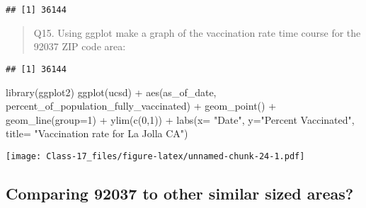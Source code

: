 \documentclass[
]{article}
\newenvironment{Shaded}{\begin{snugshade}}{\end{snugshade}}
\newcommand{\AttributeTok}[1]{\textcolor[rgb]{0.77,0.63,0.00}{#1}}
\newcommand{\DecValTok}[1]{\textcolor[rgb]{0.00,0.00,0.81}{#1}}
\newcommand{\FunctionTok}[1]{\textcolor[rgb]{0.00,0.00,0.00}{#1}}
\newcommand{\NormalTok}[1]{#1}
\newcommand{\OtherTok}[1]{\textcolor[rgb]{0.56,0.35,0.01}{#1}}
\newcommand{\SpecialCharTok}[1]{\textcolor[rgb]{0.00,0.00,0.00}{#1}}
\newcommand{\StringTok}[1]{\textcolor[rgb]{0.31,0.60,0.02}{#1}}
\begin{document}
\begin{verbatim}
## [1] 36144
\end{verbatim}

\begin{quote}
Q15. Using ggplot make a graph of the vaccination rate time course for
the 92037 ZIP code area:
\end{quote}

\begin{Shaded}
\end{Shaded}

\begin{verbatim}
## [1] 36144
\end{verbatim}

\begin{Shaded}
\begin{Highlighting}[]
\FunctionTok{library}\NormalTok{(ggplot2)}
\FunctionTok{ggplot}\NormalTok{(ucsd) }\SpecialCharTok{+}
  \FunctionTok{aes}\NormalTok{(as\_of\_date,}
\NormalTok{      percent\_of\_population\_fully\_vaccinated) }\SpecialCharTok{+}
  \FunctionTok{geom\_point}\NormalTok{() }\SpecialCharTok{+}
  \FunctionTok{geom\_line}\NormalTok{(}\AttributeTok{group=}\DecValTok{1}\NormalTok{) }\SpecialCharTok{+}
  \FunctionTok{ylim}\NormalTok{(}\FunctionTok{c}\NormalTok{(}\DecValTok{0}\NormalTok{,}\DecValTok{1}\NormalTok{)) }\SpecialCharTok{+}
  \FunctionTok{labs}\NormalTok{(}\AttributeTok{x=} \StringTok{"Date"}\NormalTok{, }\AttributeTok{y=}\StringTok{"Percent Vaccinated"}\NormalTok{, }\AttributeTok{title=} \StringTok{"Vaccination rate for La Jolla CA"}\NormalTok{)}
\end{Highlighting}
\end{Shaded}

\texttt{[image: Class-17\_files/figure-latex/unnamed-chunk-24-1.pdf]}

\hypertarget{comparing-92037-to-other-similar-sized-areas}{%
\subsection{Comparing 92037 to other similar sized
areas?}\label{comparing-92037-to-other-similar-sized-areas}}
\end{document}
